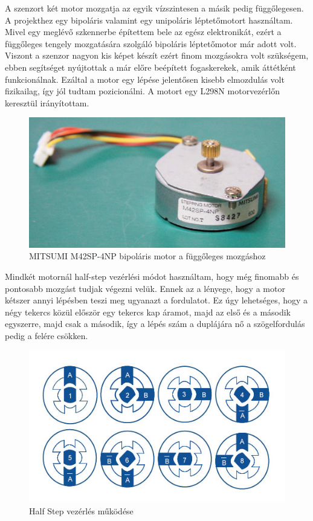 \documentclass[]{thesis-ekf}
\theoremstyle{definition}
\theoremstyle{remark}
\begin{document}
	A szenzort két motor mozgatja az egyik vízszintesen a másik pedig függőlegesen. A projekthez egy bipoláris valamint egy unipoláris léptetőmotort\cite{motorvezerlok} használtam. Mivel egy meglévő szkennerbe építettem bele az egész elektronikát, ezért a függőleges tengely mozgatására szolgáló bipoláris léptetőmotor már adott volt. Viszont a szenzor nagyon kis képet készít ezért finom mozgásokra volt szükségem, ebben segítséget nyújtottak a már előre beépített fogaskerekek, amik áttétként funkcionálnak. Ezáltal a motor egy lépése jelentősen kisebb elmozdulás volt fizikailag, így jól tudtam pozicionálni. A motort egy L298N\cite{l298n} motorvezérlőn keresztül irányítottam.
	\begin{figure}[th!]
		\centering
		\includegraphics[width=0.4\linewidth]{MITSUMI-Stepping-Motor-M42SP-4NP}
		\caption[Mitsumi]{\footnotesize {MITSUMI M42SP-4NP bipoláris motor a függőleges mozgáshoz}}
		\label{fig:mitsumi-stepping-motor-m42sp-4np}
	\end{figure}
	
	Mindkét motornál half-step vezérlési módot használtam, hogy még finomabb és pontosabb mozgást tudjak végezni velük. Ennek az a lényege, hogy a motor kétszer annyi lépésben teszi meg ugyanazt a fordulatot. Ez úgy lehetséges, hogy a négy tekercs közül először egy tekercs kap áramot, majd az első és a második egyszerre, majd csak a második, így a lépés szám a duplájára nő a szögelfordulás pedig a felére csökken.
	
	\begin{figure}[th!]
		\centering
		\includegraphics[width=0.5\linewidth]{stepper-motors-half-step}
		\caption[Half Step vezérlés]{Half Step vezérlés működése}
		\label{fig:stepper-motors-half-step}
	\end{figure}
	
\end{document}
